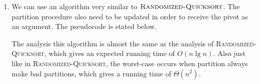 \begin{enumerate}
\begin{framed}
\begin{enumerate}
\item We can use an algorithm very similar to $\textsc{Randomized-Quicksort}$.
The partition procedure also need to be updated in order to receive the pivot as
an argument. The pseudocode is stated below.

\begin{algorithm}[H]
\SetAlgoNoEnd\DontPrintSemicolon
\BlankLine
{}
\nonl{}
\end{algorithm}

\newpage

\begin{algorithm}[H]
\SetAlgoNoEnd\DontPrintSemicolon
\BlankLine
{}
\nonl{}
\end{algorithm}

The analysis this algorithm is almost the same as the analysis of
\textsc{Randomized-Quicksort}, which gives an expected running time of
$O(n \lg n)$. Also just like in \textsc{Randomized-Quicksort}, the worst-case
occurs when partition always make bad partitions, which gives a running time of
$\Theta(n^2)$.
\end{enumerate}
\end{framed}

\newpage


\end{enumerate}
